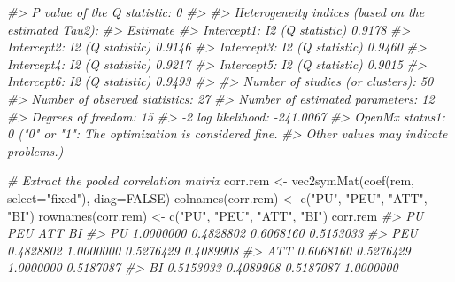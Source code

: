 \documentclass[
]{book}
\newenvironment{Shaded}{\begin{snugshade}}{\end{snugshade}}
\newcommand{\AttributeTok}[1]{\textcolor[rgb]{0.77,0.63,0.00}{#1}}
\newcommand{\CommentTok}[1]{\textcolor[rgb]{0.56,0.35,0.01}{\textit{#1}}}
\newcommand{\ConstantTok}[1]{\textcolor[rgb]{0.00,0.00,0.00}{#1}}
\newcommand{\FunctionTok}[1]{\textcolor[rgb]{0.00,0.00,0.00}{#1}}
\newcommand{\NormalTok}[1]{#1}
\newcommand{\OtherTok}[1]{\textcolor[rgb]{0.56,0.35,0.01}{#1}}
\newcommand{\StringTok}[1]{\textcolor[rgb]{0.31,0.60,0.02}{#1}}
\begin{document}
\begin{Shaded}
\begin{Highlighting}[]
\CommentTok{\#\textgreater{} P value of the Q statistic: 0}
\CommentTok{\#\textgreater{} }
\CommentTok{\#\textgreater{} Heterogeneity indices (based on the estimated Tau2):}
\CommentTok{\#\textgreater{}                              Estimate}
\CommentTok{\#\textgreater{} Intercept1: I2 (Q statistic)   0.9178}
\CommentTok{\#\textgreater{} Intercept2: I2 (Q statistic)   0.9146}
\CommentTok{\#\textgreater{} Intercept3: I2 (Q statistic)   0.9460}
\CommentTok{\#\textgreater{} Intercept4: I2 (Q statistic)   0.9217}
\CommentTok{\#\textgreater{} Intercept5: I2 (Q statistic)   0.9015}
\CommentTok{\#\textgreater{} Intercept6: I2 (Q statistic)   0.9493}
\CommentTok{\#\textgreater{} }
\CommentTok{\#\textgreater{} Number of studies (or clusters): 50}
\CommentTok{\#\textgreater{} Number of observed statistics: 27}
\CommentTok{\#\textgreater{} Number of estimated parameters: 12}
\CommentTok{\#\textgreater{} Degrees of freedom: 15}
\CommentTok{\#\textgreater{} {-}2 log likelihood: {-}241.0067 }
\CommentTok{\#\textgreater{} OpenMx status1: 0 ("0" or "1": The optimization is considered fine.}
\CommentTok{\#\textgreater{} Other values may indicate problems.)}
\end{Highlighting}
\end{Shaded}

\begin{Shaded}
\begin{Highlighting}[]
\CommentTok{\# Extract the pooled correlation matrix}
\NormalTok{corr.rem }\OtherTok{\textless{}{-}} \FunctionTok{vec2symMat}\NormalTok{(}\FunctionTok{coef}\NormalTok{(rem, }\AttributeTok{select=}\StringTok{"fixed"}\NormalTok{), }\AttributeTok{diag=}\ConstantTok{FALSE}\NormalTok{)}
\FunctionTok{colnames}\NormalTok{(corr.rem) }\OtherTok{\textless{}{-}} \FunctionTok{c}\NormalTok{(}\StringTok{"PU"}\NormalTok{, }\StringTok{"PEU"}\NormalTok{, }\StringTok{"ATT"}\NormalTok{, }\StringTok{"BI"}\NormalTok{)}
\FunctionTok{rownames}\NormalTok{(corr.rem) }\OtherTok{\textless{}{-}} \FunctionTok{c}\NormalTok{(}\StringTok{"PU"}\NormalTok{, }\StringTok{"PEU"}\NormalTok{, }\StringTok{"ATT"}\NormalTok{, }\StringTok{"BI"}\NormalTok{)}
\NormalTok{corr.rem}
\CommentTok{\#\textgreater{}            PU       PEU       ATT        BI}
\CommentTok{\#\textgreater{} PU  1.0000000 0.4828802 0.6068160 0.5153033}
\CommentTok{\#\textgreater{} PEU 0.4828802 1.0000000 0.5276429 0.4089908}
\CommentTok{\#\textgreater{} ATT 0.6068160 0.5276429 1.0000000 0.5187087}
\CommentTok{\#\textgreater{} BI  0.5153033 0.4089908 0.5187087 1.0000000}
\end{Highlighting}
\end{Shaded}
\end{document}
